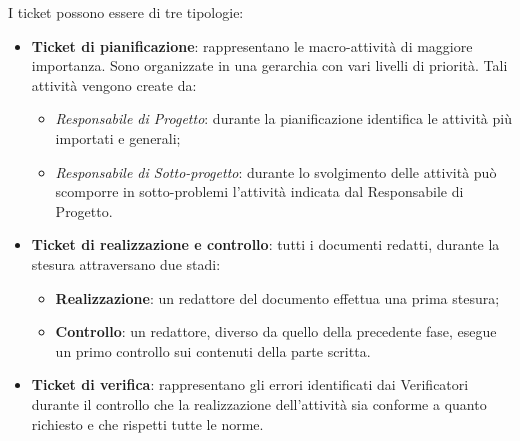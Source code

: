 I ticket possono essere di tre tipologie:
\begin{itemize}


\item \textbf{Ticket di pianificazione}: rappresentano le macro-attività di maggiore importanza. Sono organizzate in una gerarchia con vari livelli di priorità.
 Tali attività vengono create da: 
\begin{itemize}
\item \emph{Responsabile di Progetto}: durante la pianificazione identifica le attività più importati e generali; 
\item \emph{Responsabile di Sotto-progetto}: durante lo svolgimento delle attività può scomporre in sotto-problemi l’attività indicata dal Responsabile di Progetto. 
\end{itemize}


\item \textbf{Ticket di realizzazione e controllo}: tutti i documenti redatti, durante la stesura attraversano due stadi: 
\begin{itemize}
\item \textbf{Realizzazione}: un redattore del documento effettua una prima stesura; 
\item \textbf{Controllo}: un redattore, diverso da quello della precedente fase, esegue un primo controllo sui contenuti della parte scritta. 
\end{itemize}


\item \textbf{Ticket di verifica}: rappresentano gli errori identificati dai Verificatori durante 
il controllo che la realizzazione dell'attività sia conforme a quanto richiesto e che 
rispetti tutte le norme.
\end{itemize}




